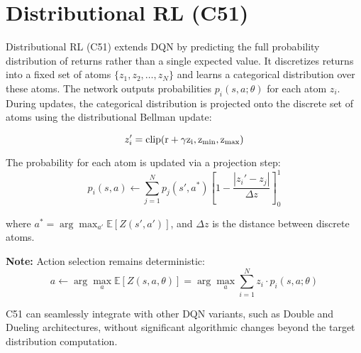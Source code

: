 \documentclass{article}
\begin{document}
\section{Distributional RL (C51)}

Distributional RL (C51) extends DQN by predicting the full probability distribution of returns rather than a single expected value. It discretizes returns into a fixed set of atoms $\{ z_1, z_2, \dots, z_N \}$ and learns a categorical distribution over these atoms. The network outputs probabilities $p_i(s,a;\theta)$ for each atom $z_i$. During updates, the categorical distribution is projected onto the discrete set of atoms using the distributional Bellman update:

\[
z_i' = \rm{clip}(r + \gamma z_i, z_{\rm{min}}, z_{\rm{max}})
\]

The probability for each atom is updated via a projection step:
\[
p_i(s,a) \leftarrow \sum_{j=1}^{N} p_j(s', a^*) \left[1 - \frac{|z_i' - z_j|}{\Delta z}\right]_0^1
\]

where $a^* = \arg\max_{a'} \mathbb{E}[Z(s', a')]$, and $\Delta z$ is the distance between discrete atoms.

\textbf{Note:} Action selection remains deterministic:
\[
a \leftarrow \arg\max_a \mathbb{E}\left[Z\left(s, a, \theta \right)\right] = \arg\max_a \sum_{i=1}^{N} z_i \cdot p_i(s, a; \theta)
\]

C51 can seamlessly integrate with other DQN variants, such as Double and Dueling architectures, without significant algorithmic changes beyond the target distribution computation.
\end{document}
